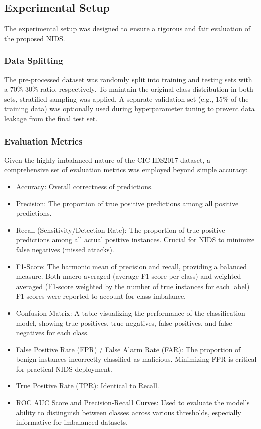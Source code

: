 \subsection{Experimental Setup}
The experimental setup was designed to ensure a rigorous and fair evaluation of the proposed NIDS.

\subsubsection{Data Splitting}
The pre-processed dataset was randomly split into training and testing sets with a 70\%-30\% ratio, respectively. To maintain the original class distribution in both sets, stratified sampling was applied. A separate validation set (e.g., 15\% of the training data) was optionally used during hyperparameter tuning to prevent data leakage from the final test set.

\subsubsection{Evaluation Metrics}
Given the highly imbalanced nature of the CIC-IDS2017 dataset, a comprehensive set of evaluation metrics was employed beyond simple accuracy:
\begin{itemize}
	\item Accuracy: Overall correctness of predictions.
	\item Precision: The proportion of true positive predictions among all positive predictions.
	\item  Recall (Sensitivity/Detection Rate): The proportion of true positive predictions among all actual positive instances. Crucial for NIDS to minimize false negatives (missed attacks).
	\item F1-Score: The harmonic mean of precision and recall, providing a balanced measure. Both macro-averaged (average F1-score per class) and weighted-averaged (F1-score weighted by the number of true instances for each label) F1-scores were reported to account for class imbalance.
	\item Confusion Matrix: A table visualizing the performance of the classification model, showing true positives, true negatives, false positives, and false negatives for each class.
	\item False Positive Rate (FPR) / False Alarm Rate (FAR): The proportion of benign instances incorrectly classified as malicious. Minimizing FPR is critical for practical NIDS deployment.
	\item True Positive Rate (TPR): Identical to Recall.
	\item ROC AUC Score and Precision-Recall Curves: Used to evaluate the model's ability to distinguish between classes across various thresholds, especially informative for imbalanced datasets.
\end{itemize}


